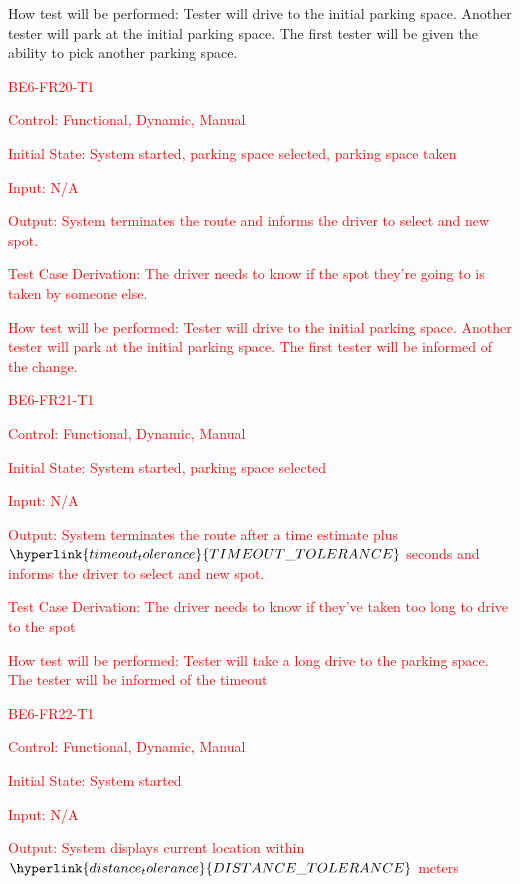 \documentclass[12pt, titlepage]{article}
\begin{document}
\begin{enumerate}
How test will be performed: Tester will drive to the initial parking space.
Another tester will park at the initial parking space. The first tester will be
given the ability to pick another parking space.

\textcolor{red}{\item{BE6-FR20-T1}}

\textcolor{red}{Control: Functional, Dynamic, Manual}

\textcolor{red}{Initial State: System started, parking space selected, parking space taken}
					
\textcolor{red}{Input: N/A}
					
\textcolor{red}{Output: System terminates the route and informs the driver to select and new spot.}

\textcolor{red}{Test Case Derivation: The driver needs to know if the spot they're going to is taken by someone else.}

\textcolor{red}{How test will be performed: Tester will drive to the initial
parking space. Another tester will park at the initial parking space. The first
tester will be informed of the change.}

\textcolor{red}{\item{BE6-FR21-T1}}

\textcolor{red}{Control: Functional, Dynamic, Manual}

\textcolor{red}{Initial State: System started, parking space selected}
					
\textcolor{red}{Input: N/A}
					
\textcolor{red}{Output: System terminates the route after a time estimate plus
$\hyperlink{timeout_tolerance}{TIMEOUT\_TOLERANCE}$ seconds and informs the
driver to select and new spot.}

\textcolor{red}{Test Case Derivation: The driver needs to know if they've taken too long to drive to the spot}

\textcolor{red}{How test will be performed: Tester will take a long drive to the parking space. The  tester will be informed of the timeout}

\textcolor{red}{\item{BE6-FR22-T1}}

\textcolor{red}{Control: Functional, Dynamic, Manual}

\textcolor{red}{Initial State: System started}
					
\textcolor{red}{Input: N/A}
					
\textcolor{red}{Output: System displays current location within
$\hyperlink{distance_tolerance}{DISTANCE\_TOLERANCE}$ meters}


\end{enumerate}
\end{document}
